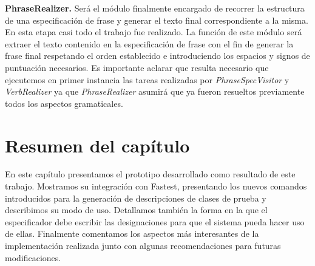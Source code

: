 \bigskip
\noindent
\textbf{PhraseRealizer.} Será el módulo finalmente encargado de recorrer la estructura de una especificación de frase y generar el texto final correspondiente a la misma. En esta etapa casi todo el trabajo fue realizado. La función de este módulo será extraer el texto contenido en la especificación de frase con el fin de generar la frase final respetando el orden establecido e introduciendo los espacios y signos de puntuación necesarios. Es importante aclarar que resulta necesario que ejecutemos en primer instancia las tareas realizadas por \textit{PhraseSpecVisitor} y \textit{VerbRealizer} ya que \textit{PhraseRealizer} asumirá que ya fueron resueltos previamente todos los aspectos gramaticales.

\section{Resumen del capítulo}
En este capítulo presentamos el prototipo desarrollado como resultado de este trabajo. Mostramos su integración con Fastest, presentando los nuevos comandos introducidos para la generación de descripciones de clases de prueba y describimos su modo de uso. Detallamos también la forma en la que el especificador debe escribir las designaciones para que el sistema pueda hacer uso de ellas. Finalmente comentamos los aspectos más interesantes de la implementación realizada junto con algunas recomendaciones para futuras modificaciones.